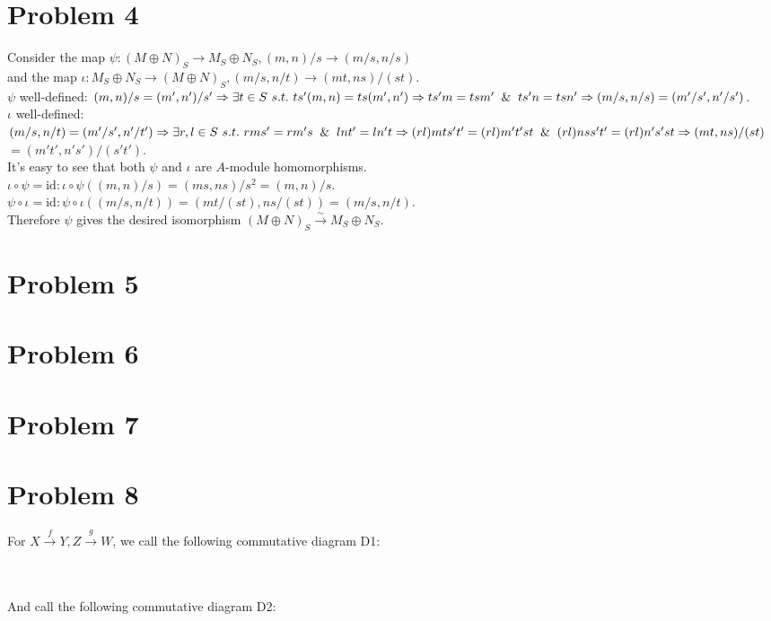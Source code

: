 \documentclass{article}
\newcommand{\ST}{\ s.t.\ }
\newcommand{\id}{\text{id}}
\newcommand{\mo}[1]{$#1$-module}
\begin{document}
\section{Problem 4}

Consider the map $\psi:(M\oplus N)_S\rightarrow M_S\oplus N_S,(m,n)/s\rightarrow (m/s,n/s)$\\
and the map $\iota:M_S\oplus N_S\rightarrow (M\oplus N)_S,(m/s,n/t)\rightarrow (mt,ns)/(st)$.\\
$\psi$ well-defined: $(m,n)/s=(m',n')/s'\Rightarrow \exists t\in S\ST ts'(m,n)=ts(m',n')\Rightarrow ts'm=tsm'\And ts'n=tsn'\Rightarrow (m/s,n/s)=(m'/s',n'/s')$.\\
$\iota$ well-defined: $(m/s,n/t)=(m'/s',n'/t')\Rightarrow \exists r,l\in S\ST rms'=rm's\And lnt'=ln't\Rightarrow (rl)mts't'=(rl)m't'st\And (rl)nss't'=(rl)n's'st\Rightarrow (mt,ns)/(st)$\\
$=(m't',n's')/(s't')$.\\
It's easy to see that both $\psi$ and $\iota$ are \mo{A} homomorphisms.\\
$\iota\circ \psi=\id:\iota\circ \psi((m,n)/s)=(ms,ns)/s^2=(m,n)/s$.\\
$\psi\circ \iota=\id:\psi\circ \iota((m/s,n/t))=(mt/(st),ns/(st))=(m/s,n/t)$.\\
Therefore $\psi$ gives the desired isomorphism $(M\oplus N)_S\xrightarrow{\sim} M_S\oplus N_S$.

\section{Problem 5}

\section{Problem 6}

\section{Problem 7}

\section{Problem 8}

For $X\xrightarrow{f} Y,Z\xrightarrow{g}W$, we call the following commutative diagram D1:\\

\\ \\
And call the following commutative diagram D2:\\
\end{document}
